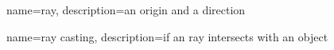 {
  name=ray,
  description={an origin and a direction}
}

{
  name=ray casting,
  description={if an ray intersects with an object}
}


